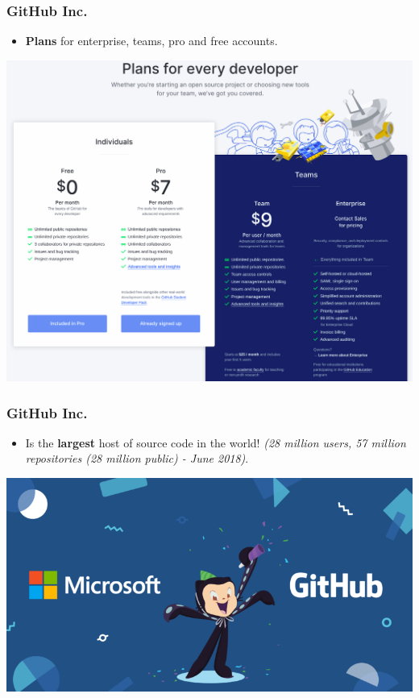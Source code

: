 \documentclass[svgnames]{beamer}
\begin{document}
\begin{frame}
    \frametitle{GitHub Inc.}
    \begin{itemize}
        \item \textbf{Plans} for enterprise, teams, pro and free accounts. \hfill \break
    \end{itemize}

\begin{center}
\includegraphics[scale=0.20]{img/github_plans.png}
\end{center}  


\end{frame}


\begin{frame}
\frametitle{GitHub Inc.}
\begin{itemize}
\item Is the \textbf{largest} host of source code in the world! \emph{(28 million users, 57 million repositories (28 million public) - June 2018)}.
\end{itemize}

\begin{center}
\includegraphics[scale=0.35]{img/microsoft-github-800x421.png}
\end{center}  

\end{frame}
\end{document}
